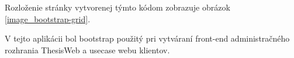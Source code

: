 	Rozloženie stránky vytvorenej týmto kódom zobrazuje obrázok \ref{image_bootstrap-grid}.
		
			
	V tejto aplikácii bol bootstrap použitý pri vytváraní front-end administračného rozhrania ThesisWeb a usecase webu klientov.
	